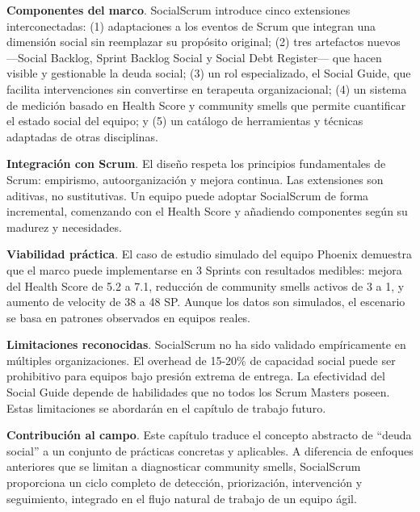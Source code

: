 \textbf{Componentes del marco}. SocialScrum introduce cinco extensiones interconectadas: (1) adaptaciones a los eventos de Scrum que integran una dimensión social sin reemplazar su propósito original; (2) tres artefactos nuevos ---Social Backlog, Sprint Backlog Social y Social Debt Register--- que hacen visible y gestionable la deuda social; (3) un rol especializado, el Social Guide, que facilita intervenciones sin convertirse en terapeuta organizacional; (4) un sistema de medición basado en Health Score y community smells que permite cuantificar el estado social del equipo; y (5) un catálogo de herramientas y técnicas adaptadas de otras disciplinas.

\textbf{Integración con Scrum}. El diseño respeta los principios fundamentales de Scrum: empirismo, autoorganización y mejora continua. Las extensiones son aditivas, no sustitutivas. Un equipo puede adoptar SocialScrum de forma incremental, comenzando con el Health Score y añadiendo componentes según su madurez y necesidades.

\textbf{Viabilidad práctica}. El caso de estudio simulado del equipo Phoenix demuestra que el marco puede implementarse en 3 Sprints con resultados medibles: mejora del Health Score de 5.2 a 7.1, reducción de community smells activos de 3 a 1, y aumento de velocity de 38 a 48 SP. Aunque los datos son simulados, el escenario se basa en patrones observados en equipos reales.

\textbf{Limitaciones reconocidas}. SocialScrum no ha sido validado empíricamente en múltiples organizaciones. El overhead de 15-20\% de capacidad social puede ser prohibitivo para equipos bajo presión extrema de entrega. La efectividad del Social Guide depende de habilidades que no todos los Scrum Masters poseen. Estas limitaciones se abordarán en el capítulo de trabajo futuro.

\textbf{Contribución al campo}. Este capítulo traduce el concepto abstracto de ``deuda social'' a un conjunto de prácticas concretas y aplicables. A diferencia de enfoques anteriores que se limitan a diagnosticar community smells, SocialScrum proporciona un ciclo completo de detección, priorización, intervención y seguimiento, integrado en el flujo natural de trabajo de un equipo ágil.